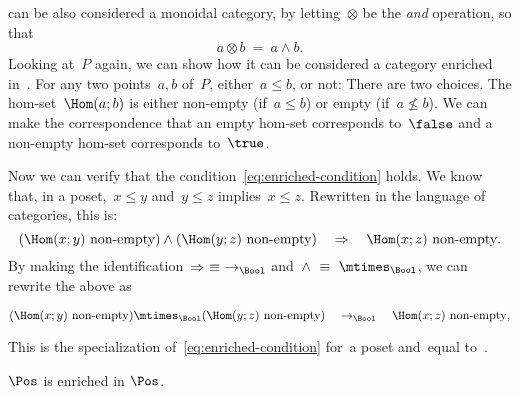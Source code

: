 {\begin{example}
        \Bool can be also considered a monoidal category, by letting~$\otimes$ be
        the \emph{and} operation, so that
        \begin{equation}
            a \otimes b\ =\ a \wedge b.
        \end{equation}
        Looking at~$P$ again, we can show how it can be considered a category enriched in~\Bool.
        For any two points~$a, b$ of~$P$, either~$a \leq b$, or not: There are two choices.
        The hom-set~$\Hom(a; b)$ is either non-empty (if~$a \leq b$) or empty (if~$a \not\leq b$).
        We can make the correspondence that an empty hom-set corresponds to~$\false$ and a non-empty hom-set corresponds to~$\true$.

        Now we can verify that the condition~\cref{eq:enriched-condition} holds.
        We know that, in a poset,~$x \leq y$ and~$y \leq z$ implies~$x \leq z$.
        Rewritten in the language of categories, this is:
        \begin{equation*}
        (\Hom(x;y)\ \text{non-empty})
            \wedge
            (\Hom(y; z)\ \text{non-empty})
            \quad
            \Rightarrow
            \quad
            \Hom(x; z)\ \text{non-empty}.
        \end{equation*}
        By making the identification~$\Rightarrow\ \equiv\ \to_{\Bool}$ and~$\wedge\ \equiv\ \mtimes_{\Bool}$, we can rewrite the above as
        \begin{widepar}
            \begin{equation*}
            (\Hom(x;y)\ \text{non-empty})
                \mtimes_{\Bool}
                (\Hom(y; z)\ \text{non-empty})
                \quad
                \to_{\Bool}
                \quad
                \Hom(x; z)\ \text{non-empty},
            \end{equation*}
        \end{widepar}
        This is the specialization of~\cref{eq:enriched-condition}
        for~\CatC a poset and~\CatD equal to~\Bool.
    \end{example}
    \begin{example}
        $\Pos$ is enriched in $\Pos$.
    \end{example}

    \begin{example}
    \end{example}

}
